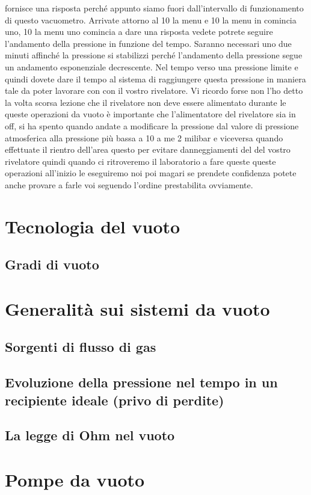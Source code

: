 fornisce una risposta perché appunto siamo fuori dall'intervallo di funzionamento di questo vacuometro. Arrivate attorno al 10 la menu e 10 la menu in comincia uno, 10 la menu uno comincia a dare una risposta vedete potrete seguire l'andamento della pressione in funzione del tempo. Saranno necessari uno due minuti affinché la pressione si stabilizzi perché l'andamento della pressione segue un andamento esponenziale decrescente. Nel tempo verso una pressione limite e quindi dovete dare il tempo al sistema di raggiungere questa pressione in maniera tale da poter lavorare con con il vostro rivelatore. Vi ricordo forse non l'ho detto la volta scorsa lezione che il rivelatore non deve essere alimentato durante le queste operazioni da vuoto è importante che l'alimentatore del rivelatore sia in off, si ha spento quando andate a modificare la pressione dal valore di pressione atmosferica alla pressione più bassa a 10 a me 2 milibar e viceversa quando effettuate il rientro dell'area questo per evitare danneggiamenti del del vostro rivelatore quindi quando ci ritroveremo il laboratorio a fare queste queste operazioni all'inizio le eseguiremo noi poi magari se prendete confidenza potete anche provare a farle voi seguendo l'ordine prestabilita ovviamente.

\section{Tecnologia del vuoto}


\subsection{Gradi di vuoto}

\section{Generalità sui sistemi da vuoto}

\subsection{Sorgenti di flusso di gas}

\subsection{Evoluzione della pressione nel tempo in un recipiente ideale (privo di perdite)}

\subsection{La legge di Ohm nel vuoto}

\section{Pompe da vuoto}

